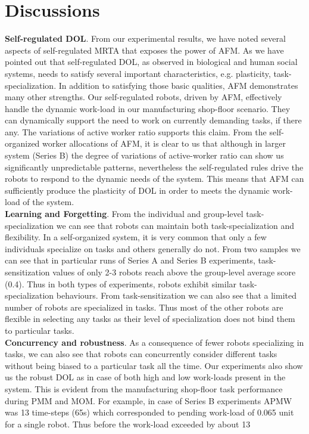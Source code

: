 \section{Discussions}
\label{afm:discuss}
\textbf{Self-regulated DOL}. From our experimental results, we have noted several aspects of self-regulated MRTA that exposes the power of AFM. As we have pointed out that self-regulated DOL, as observed in biological and human social systems, needs to satisfy several important characteristics, e.g. plasticity, task-specialization. In addition to satisfying those basic qualities, AFM  demonstrates many other strengths. Our self-regulated robots, driven by AFM, effectively handle the dynamic work-load in our manufacturing shop-floor scenario. They can dynamically support the need to work on currently demanding tasks, if there any. The variations of active worker ratio supports this claim. From the self-organized worker allocations of AFM, it is clear to us that although in larger system (Series B) the degree of variations of active-worker ratio can show us significantly unpredictable patterns, nevertheless the self-regulated rules drive the robots to respond to the dynamic needs of the system. This means that AFM can sufficiently produce the plasticity of DOL in order to meets the dynamic work-load of the system.\\
\textbf{Learning and Forgetting}. From the individual and group-level task-specialization we can see that robots can maintain both task-specialization and flexibility. In a self-organized system, it is very common that only a few individuals specialize on tasks and others generally do not. From two samples we can see that in particular runs of Series A and Series B experiments, task-sensitization values of  only 2-3 robots reach above the group-level average score (0.4). Thus in both types of experiments, robots exhibit similar task-specialization behaviours. From task-sensitization we can also see that a limited number of robots are specialized in tasks. Thus most of the other robots are flexible in selecting any tasks as their level of specialization does not bind them to particular tasks.\\
\textbf{Concurrency and robustness}. As a consequence of fewer robots specializing in tasks, we can also see that robots can concurrently  consider different tasks without being biased to a particular task all the time. Our experiments also show us the robust DOL as in case of  both high and low work-loads present in the system. This is evident from the manufacturing shop-floor task performance during PMM and MOM. For example,  in case of Series B experiments APMW was 13 time-steps (65s) which corresponded  to pending work-load of 0.065 unit for a single robot. Thus before the work-load exceeded by about 13%

